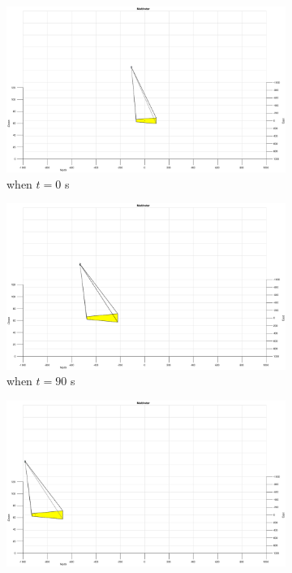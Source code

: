 \begin{figure}[htbp]
	\centering
	\begin{subfigure}[t]{0.32\linewidth}
		\includegraphics[width=\textwidth]{images/chapter4/image_UAV_-5mps}
		\caption{when $t=0$ s}
	\end{subfigure}
	\begin{subfigure}[t]{0.32\linewidth}
		\includegraphics[width=\textwidth]{images/chapter4/image_UAV_-5mps_90s}
		\caption{when $t=90$ s}
	\end{subfigure}
	\begin{subfigure}[t]{0.32\linewidth}
		\includegraphics[width=\textwidth]{images/chapter4/image_UAV_-5mps_180s}

\end{subfigure}
\end{figure}
